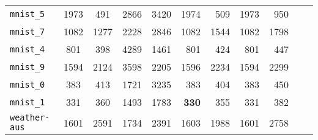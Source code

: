 \begin{tabular}{lccrrrrrrrr}
\texttt{mnist\_5} & 1973 & 491 & 2866 & 3420 & 1974 & 509 & 1973 & 950\\
\texttt{mnist\_7} & 1082 & 1277 & 2228 & 2846 & 1082 & 1544 & 1082 & 1798\\
\texttt{mnist\_4} & 801 & 398 & 4289 & 1461 & 801 & 424 & 801 & 447\\
\texttt{mnist\_9} & 1594 & 2124 & 3598 & 2205 & 1596 & 2234 & 1594 & 2299\\
\texttt{mnist\_0} & 383 & 413 & 1721 & 3235 & 383 & 404 & 383 & 450\\
\texttt{mnist\_1} & 331 & 360 & 1493 & 1783 & \textbf{330} & 355 & 331 & 382\\
\texttt{weather-aus} & 1601 & 2591 & 1734 & 2391 & 1603 & 1988 & 1601 & 2758\\
\bottomrule
\end{tabular}
